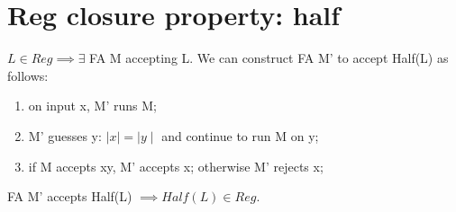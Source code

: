 \documentclass{article}
\begin{document}
\section{Reg closure property: half}
$L \in Reg \implies \exists$ FA M accepting L. We can construct FA M' to accept
Half(L) as follows:
\begin{enumerate}
  \item on input x, M' runs M;
  \item M' guesses y: $\mid x \mid = \mid y \mid$ and continue to run M on y;
  \item if M accepts xy, M' accepts x; otherwise M' rejects x;
\end{enumerate}
FA M' accepts Half(L) $\implies Half(L) \in Reg$.
\end{document}
